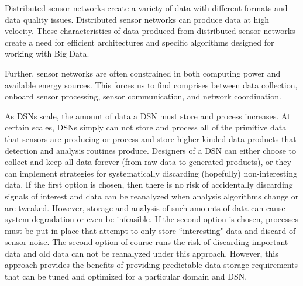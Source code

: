 Distributed sensor networks create a variety of data with different formats and data quality issues. Distributed sensor networks can produce data at high velocity. These characteristics of data produced from distributed sensor networks create a need for efficient architectures and specific algorithms designed for working with Big Data.

Further, sensor networks are often constrained in both computing power and available energy sources. This forces us to find comprises between data collection, onboard sensor processing, sensor communication, and network coordination.

As DSNs scale, the amount of data a DSN must store and process increases. At certain scales, DSNs simply can not store and process all of the primitive data that sensors are producing or process and store higher kinded data products that detection and analysis routines produce. Designers of a DSN can either choose to collect and keep all data forever (from raw data to generated products), or they can implement strategies for systematically discarding (hopefully) non-interesting data. If the first option is chosen, then there is no risk of accidentally discarding signals of interest and data can be reanalyzed when analysis algorithms change or are tweaked. However, storage and analysis of such amounts of data can cause system degradation or even be infeasible. If the second option is chosen, processes must be put in place that attempt to only store ``interesting" data and discard of sensor noise.  The second option of course runs the risk of discarding important data and old data can not be reanalyzed under this approach. However, this approach provides the benefits of providing predictable data storage requirements that can be tuned and optimized for a particular domain and DSN.

